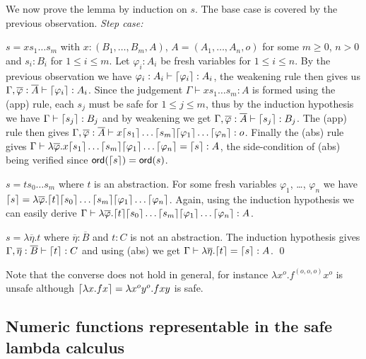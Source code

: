 We now prove the lemma by induction on $s$.
The base case is covered by the previous observation.
\emph{Step case:}
\begin{compactitem}
\item $s = x s_1 \ldots s_m$ with $x: (B_1, \ldots, B_m, A)$, $A = (A_1, \ldots, A_n, o)$ for some $m\geq 0$, $n>0$ and $s_i : B_i$ for $1 \leq i \leq
  m$.  Let $\varphi_i: A_i$ be fresh variables for $1\leq i \leq
  n$. By the previous observation we have $\varphi_i :A_i \vdash \lceil \varphi_i\rceil :A_i$, the weakening rule then gives us $\Gamma , \overline{\varphi} : \overline{A}
  \vdash \lceil \varphi_i\rceil : A_i$.  Since the judgement
  $\Gamma \vdash x s_1 \ldots s_m : A$ is formed using the {\sf (app)} rule, each $s_j$ must be safe for $1\leq j \leq m$, thus by the induction hypothesis we have $\Gamma \vdash \lceil s_j\rceil : B_j$ and by weakening we get $\Gamma, \overline{\varphi} :\overline{A} \vdash \lceil s_j\rceil : B_j$.  The {\sf(app)}
  rule then gives $\Gamma, \overline{\varphi} :\overline{A} \vdash x \lceil s_1\rceil \ldots \lceil s_m\rceil \lceil \varphi_1\rceil \ldots \lceil \varphi_n\rceil : o$. Finally
  the {\sf (abs)} rule gives $\Gamma \vdash \lambda \overline{\varphi} . x
  \lceil s_1\rceil \ldots \lceil s_m\rceil \lceil \varphi_1\rceil \ldots
  \lceil \varphi_n\rceil = \lceil s\rceil : A$, the side-condition of {\sf (abs)} being verified since ${\sf ord}(\lceil s\rceil) = {\sf ord}(s)$.


\item $s = t s_0 \ldots s_m$ where $t$ is an abstraction.
For some fresh variables $\varphi_1$, \ldots, $\varphi_n$
we have $\lceil s\rceil = \lambda \overline{\varphi}. \lceil t\rceil \lceil s_0\rceil \ldots \lceil s_m\rceil \lceil \varphi_1\rceil
  \ldots \lceil \varphi_n\rceil$. Again, using the induction hypothesis we can easily derive $\Gamma \vdash
 \lambda \overline{\varphi}. \lceil t\rceil \lceil s_0\rceil \ldots \lceil s_m\rceil \lceil \varphi_1\rceil \ldots \lceil \varphi_n\rceil : A$.

\item $s = \lambda \overline{\eta} . t $ where
$\overline{\eta} : \overline{B}$ and $t:C$ is not an abstraction. The induction hypothesis gives $\Gamma,
  \overline{\eta} : \overline{B} \vdash \lceil t\rceil : C$ and using
{\sf(abs)} we get $\Gamma \vdash \lambda \overline{\eta} . \lceil t\rceil = \lceil s\rceil : A$.  \qed
\end{compactitem}


Note that the converse does not hold in general, for instance $\lambda
x^o . f^{(o,o,o)} x^o$ is unsafe although $\lceil \lambda x . f x\rceil =
\lambda x^o y^o . f x y$ is safe.

\subsection*{Numeric functions representable in the safe lambda calculus}

